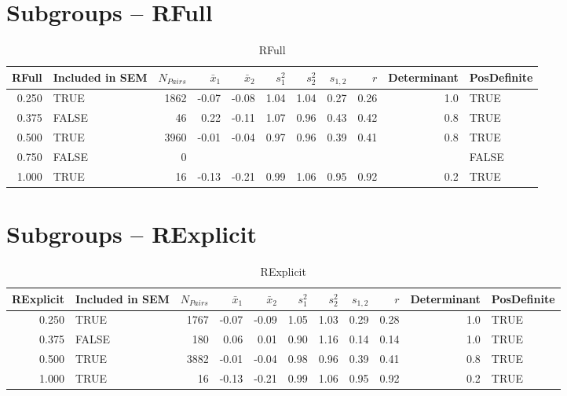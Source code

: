 \documentclass{article}\usepackage[]{graphicx}\usepackage[]{color}
\begin{document}
\section{Subgroups --  RFull }%
\begin{table}[ht]
\centering
\begin{tabular}{rlrrrrrrrrl}
  \hline
RFull & Included in SEM & $N_{Pairs}$ & $\bar{x}_1$ & $\bar{x}_2$ & $s_1^2$ & $s_2^2$ & $s_{1,2}$ & $r$ & Determinant & PosDefinite \\ 
  \hline
0.250 & TRUE & 1862 & -0.07 & -0.08 & 1.04 & 1.04 & 0.27 & 0.26 & 1.0 & TRUE \\ 
  0.375 & FALSE & 46 & 0.22 & -0.11 & 1.07 & 0.96 & 0.43 & 0.42 & 0.8 & TRUE \\ 
  0.500 & TRUE & 3960 & -0.01 & -0.04 & 0.97 & 0.96 & 0.39 & 0.41 & 0.8 & TRUE \\ 
  0.750 & FALSE & 0 &  &  &  &  &  &  &  & FALSE \\ 
  1.000 & TRUE & 16 & -0.13 & -0.21 & 0.99 & 1.06 & 0.95 & 0.92 & 0.2 & TRUE \\ 
   \hline
\end{tabular}
\caption{RFull} 
\end{table}
\section{Subgroups --  RExplicit }%
\begin{table}[ht]
\centering
\begin{tabular}{rlrrrrrrrrl}
  \hline
RExplicit & Included in SEM & $N_{Pairs}$ & $\bar{x}_1$ & $\bar{x}_2$ & $s_1^2$ & $s_2^2$ & $s_{1,2}$ & $r$ & Determinant & PosDefinite \\ 
  \hline
0.250 & TRUE & 1767 & -0.07 & -0.09 & 1.05 & 1.03 & 0.29 & 0.28 & 1.0 & TRUE \\ 
  0.375 & FALSE & 180 & 0.06 & 0.01 & 0.90 & 1.16 & 0.14 & 0.14 & 1.0 & TRUE \\ 
  0.500 & TRUE & 3882 & -0.01 & -0.04 & 0.98 & 0.96 & 0.39 & 0.41 & 0.8 & TRUE \\ 
  1.000 & TRUE & 16 & -0.13 & -0.21 & 0.99 & 1.06 & 0.95 & 0.92 & 0.2 & TRUE \\ 
   \hline
\end{tabular}
\caption{RExplicit} 
\end{table}
\end{document}
